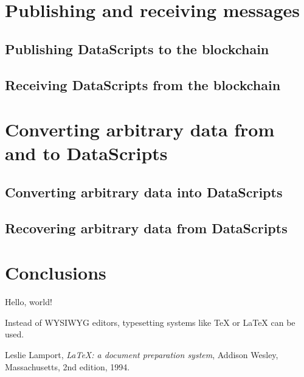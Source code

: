 \documentclass{article}
\begin{document}
\section{Publishing and receiving messages}

\subsection{Publishing DataScripts to the blockchain}

\subsection{Receiving DataScripts from the blockchain}

\section{Converting arbitrary data from and to DataScripts}

\subsection{Converting arbitrary data into DataScripts}

\subsection{Recovering arbitrary data from DataScripts}

\section{Conclusions}

    Hello, world!

    Instead of WYSIWYG editors, typesetting systems like \TeX{} or \LaTeX{} \cite{lamport94} can be used.


\begin{thebibliography}{9}

  Leslie Lamport,
    \textit{\LaTeX: a document preparation system},
    Addison Wesley, Massachusetts,
    2nd edition,
    1994.

\end{thebibliography}
\end{document}
